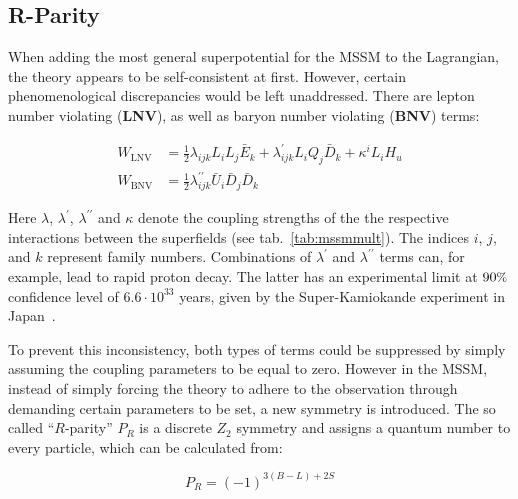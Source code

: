 \subsection{R-Parity}

When adding the most general superpotential for the MSSM to the Lagrangian, the theory appears to be self-consistent at first. However, certain phenomenological discrepancies would be left unaddressed. There are lepton number violating (\textbf{LNV}), as well as baryon number violating (\textbf{BNV}) terms:


\begin{align}
  \label{eq:lnvlagr}
  W_{\text{LNV}} &= \frac{1}{2} \lambda_{ijk} L_i L_j \bar{E}_k + \lambda^\prime_{ijk} L_i Q_j \bar{D}_k + \kappa^{i} L_i H_u \\
  \label{eq:bnvlagr}
  W_{\text{BNV}} &= \frac{1}{2} \lambda^{\prime\prime}_{ijk} \bar{U}_i \bar{D}_j \bar{D}_k
\end{align}


\noindent Here $\lambda$, $\lambda^\prime$, $\lambda^{\prime\prime}$ and $\kappa$ denote the coupling strengths of the the respective interactions between the superfields (see tab.~\ref{tab:mssmmult}). The indices $i$, $j$, and $k$ represent family numbers. Combinations of $\lambda^\prime$ and $\lambda^{\prime\prime}$ terms can, for example, lead to rapid proton decay. The latter has an experimental limit at $90\pct$ confidence level of $6.6 \cdot 10^{33}$ years, given by the Super-Kamiokande experiment in Japan~\cite{protondecay}.

To prevent this inconsistency, both types of terms could be suppressed by simply assuming the coupling parameters to be equal to zero. However in the MSSM, instead of simply forcing the theory to adhere to the observation through demanding certain parameters to be set, a new symmetry is introduced. The so called ``$R$-parity'' $P_R$ is a discrete $Z_2$ symmetry and assigns a quantum number to every particle, which can be calculated from:

\begin{equation}
  \label{eq:rparity}
  P_R = (-1)^{3 (B-L) + 2 S}
\end{equation}

